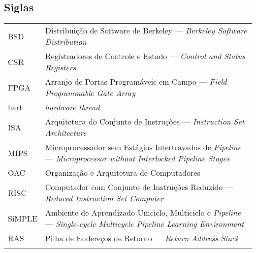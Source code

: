 


\subsection*{Siglas}

\begin{tabular}{p{}p{}}
    {BSD} & {Distribuição de Software de Berkeley --- \textit{Berkeley Software Distribution}}\tabularnewline{}
    {CSR} & {Registradores de Controle e Estado --- \textit{Control and Status Registers}} \tabularnewline{}
    {FPGA} & {Arranjo de Portas Programáveis em Campo --- \textit{Field Programmable Gate Array}} \tabularnewline{}
    {hart} & {\textit{hardware thread}} \tabularnewline{}
    {ISA} & {Arquitetura do Conjunto de Instruções --- \textit{Instruction Set Architecture}} \tabularnewline{}
    {MIPS} & {Microprocessador sem Estágios Intertravados de \textit{Pipeline} --- \textit{Microprocessor without Interlocked Pipeline Stages}} \tabularnewline{}
    {OAC} & {Organização e Arquitetura de Computadores} \tabularnewline{}
    {RISC} & {Computador com Conjunto de Instruções Reduzido --- \textit{Reduced Instruction Set Computer}} \tabularnewline{}
    {SiMPLE} & {Ambiente de Aprendizado Uniciclo, Multiciclo e \textit{Pipeline} --- \textit{Single-cycle Multicycle Pipeline Learning Environment}} \tabularnewline{}
    {RAS} & {Pilha de Endereços de Retorno --- \textit{Return Address Stack}} \tabularnewline{}
\end{tabular}
